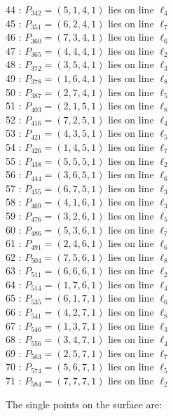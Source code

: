 \documentclass{article}
\begin{document}
{\begin{multicols}{2}
44 : $P_{342}=( 5, 1, 4, 1 )$ lies on line $\ell_{4}$\\
45 : $P_{351}=( 6, 2, 4, 1 )$ lies on line $\ell_{7}$\\
46 : $P_{360}=( 7, 3, 4, 1 )$ lies on line $\ell_{6}$\\
47 : $P_{365}=( 4, 4, 4, 1 )$ lies on line $\ell_{2}$\\
48 : $P_{372}=( 3, 5, 4, 1 )$ lies on line $\ell_{3}$\\
49 : $P_{378}=( 1, 6, 4, 1 )$ lies on line $\ell_{8}$\\
50 : $P_{387}=( 2, 7, 4, 1 )$ lies on line $\ell_{5}$\\
51 : $P_{403}=( 2, 1, 5, 1 )$ lies on line $\ell_{8}$\\
52 : $P_{416}=( 7, 2, 5, 1 )$ lies on line $\ell_{4}$\\
53 : $P_{421}=( 4, 3, 5, 1 )$ lies on line $\ell_{5}$\\
54 : $P_{426}=( 1, 4, 5, 1 )$ lies on line $\ell_{7}$\\
55 : $P_{438}=( 5, 5, 5, 1 )$ lies on line $\ell_{2}$\\
56 : $P_{444}=( 3, 6, 5, 1 )$ lies on line $\ell_{6}$\\
57 : $P_{455}=( 6, 7, 5, 1 )$ lies on line $\ell_{3}$\\
58 : $P_{469}=( 4, 1, 6, 1 )$ lies on line $\ell_{3}$\\
59 : $P_{476}=( 3, 2, 6, 1 )$ lies on line $\ell_{5}$\\
60 : $P_{486}=( 5, 3, 6, 1 )$ lies on line $\ell_{7}$\\
61 : $P_{491}=( 2, 4, 6, 1 )$ lies on line $\ell_{6}$\\
62 : $P_{504}=( 7, 5, 6, 1 )$ lies on line $\ell_{8}$\\
63 : $P_{511}=( 6, 6, 6, 1 )$ lies on line $\ell_{2}$\\
64 : $P_{514}=( 1, 7, 6, 1 )$ lies on line $\ell_{4}$\\
65 : $P_{535}=( 6, 1, 7, 1 )$ lies on line $\ell_{6}$\\
66 : $P_{541}=( 4, 2, 7, 1 )$ lies on line $\ell_{8}$\\
67 : $P_{546}=( 1, 3, 7, 1 )$ lies on line $\ell_{3}$\\
68 : $P_{556}=( 3, 4, 7, 1 )$ lies on line $\ell_{4}$\\
69 : $P_{563}=( 2, 5, 7, 1 )$ lies on line $\ell_{7}$\\
70 : $P_{574}=( 5, 6, 7, 1 )$ lies on line $\ell_{5}$\\
71 : $P_{584}=( 7, 7, 7, 1 )$ lies on line $\ell_{2}$\\
\end{multicols}
The single points on the surface are:\\
}
\end{document}
